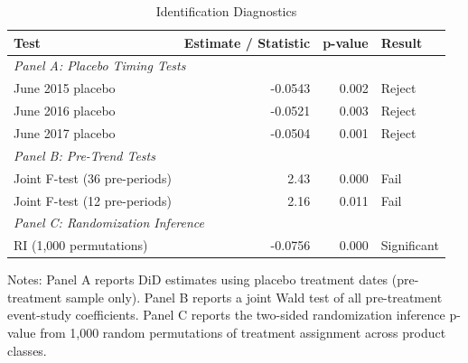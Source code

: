\begin{table}[H]
\centering
\caption{Identification Diagnostics}
\label{tab:diagnostics}
\begin{threeparttable}
\begin{tabular}{lrrl}
\toprule
Test & Estimate / Statistic & p-value & Result \\
\midrule
\multicolumn{4}{l}{\textit{Panel A: Placebo Timing Tests}} \\
June 2015 placebo & -0.0543 & 0.002 & Reject \\
June 2016 placebo & -0.0521 & 0.003 & Reject \\
June 2017 placebo & -0.0504 & 0.001 & Reject \\
\midrule
\multicolumn{4}{l}{\textit{Panel B: Pre-Trend Tests}} \\
Joint F-test (36 pre-periods) & 2.43 & 0.000 & Fail \\
Joint F-test (12 pre-periods) & 2.16 & 0.011 & Fail \\
\midrule
\multicolumn{4}{l}{\textit{Panel C: Randomization Inference}} \\
RI (1,000 permutations) & -0.0756 & 0.000 & Significant \\
\bottomrule
\end{tabular}
\begin{tablenotes}[flushleft]
\small
\item Notes: Panel A reports DiD estimates using placebo treatment dates (pre-treatment sample only). Panel B reports a joint Wald test of all pre-treatment event-study coefficients. Panel C reports the two-sided randomization inference p-value from 1,000 random permutations of treatment assignment across product classes.
\end{tablenotes}
\end{threeparttable}
\end{table}

